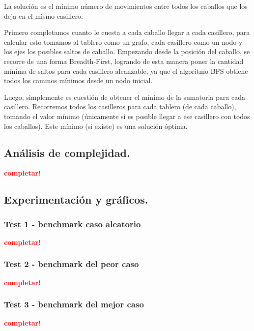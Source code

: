 \vspace*{0.3cm}

La solución es el mínimo número de movimientos entre todos los caballos que
los deja en el mismo casillero.

Primero completamos cuanto le cuesta a cada caballo llegar a cada
casillero, para calcular esto tomamos al tablero como un grafo, cada
casillero como un nodo y los ejes los posibles saltos de caballo. Empezando
desde la posición del caballo, se recorre de una forma Breadth-First,
logrando de esta manera poner la cantidad mínima de saltos para cada
casillero alcanzable, ya que el algoritmo BFS obtiene todos los caminos
mínimos desde un nodo inicial.

Luego, simplemente es cuestión de obtener el mínimo de la sumatoria para cada casillero.
Recorremos todos los casilleros para cada tablero (de cada caballo),
tomando el valor mínimo (únicamente si es posible llegar a ese casillero
con todos los caballos).
Este mínimo (si existe) es una solución óptima.

\newpage
\subsection{Análisis de complejidad.}

\vspace*{0.3cm}

\textcolor{red}{\textbf{completar!}}



\newpage
\subsection{Experimentación y gráficos.}

\vspace*{0.3cm}

\subsubsection{Test 1 - benchmark caso aleatorio}

\textcolor{red}{\textbf{completar!}}


\newpage
\subsubsection{Test 2 - benchmark del peor caso}

\textcolor{red}{\textbf{completar!}}


\newpage
\subsubsection{Test 3 - benchmark del mejor caso}

\textcolor{red}{\textbf{completar!}}
